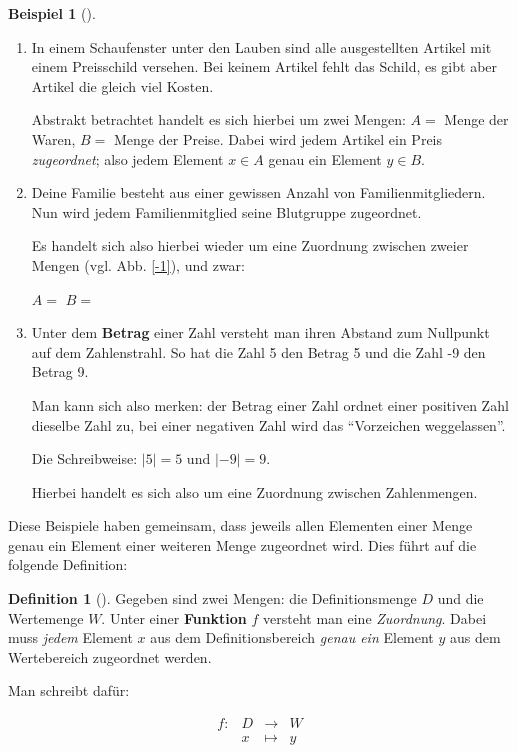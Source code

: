 \documentclass[a4paper, twoside, parskip, 10pt, smallheadings]{scrbook}
\theoremstyle{plain}
\theoremstyle{definition}
\newtheorem{Def}{Definition}%
\newtheorem{Bsp}{Beispiel}%
\newenvironment{fshaded}{%
\def\FrameCommand{\fcolorbox{framecolor}{shadecolor}}%
\MakeFramed {\FrameRestore}}%
{\endMakeFramed}
\newenvironment{fdef}[1][]{\definecolor{shadecolor}{rgb}{1,1,.29}%
\definecolor{framecolor}{rgb}{1,1,0}%
\begin{fshaded}\begin{Def}[#1]}{\end{Def}\end{fshaded}}
\newenvironment{fbsp}[1][]{\definecolor{shadecolor}{rgb}{.57,1,.28}%
\definecolor{framecolor}{rgb}{.25, .63, 0}%
\begin{fshaded}\begin{Bsp}[#1]}{\end{Bsp}\end{fshaded}}
\newcommand{\bb}{\begin{fbsp}}
\newcommand{\eb}{\end{fbsp}}
\newcommand{\bd}{\begin{fdef}}
\newcommand{\ed}{\end{fdef}}
\begin{document}
\bb
\begin{enumerate}
\item In einem Schaufenster unter den Lauben sind alle ausgestellten Artikel mit einem Preisschild versehen.
Bei keinem Artikel fehlt das Schild, es gibt aber Artikel die
gleich viel Kosten.

Abstrakt betrachtet handelt es sich hierbei um zwei Mengen: $A=$
Menge der Waren, $B=$ Menge der Preise. Dabei wird jedem Artikel
ein Preis {\it zugeordnet}; also jedem Element $x\in A$ genau ein
Element $y\in B$.

\item Deine Familie besteht aus einer gewissen Anzahl von
Familienmitgliedern. Nun wird jedem Familienmitglied seine
Blutgruppe zugeordnet.

Es handelt sich also hierbei wieder um eine Zuordnung zwischen
zweier Mengen (vgl. Abb. \ref{-1}), und zwar:

$A=$ \qquad \qquad   $B=$



\item Unter dem {\bf Betrag} einer Zahl versteht man ihren Abstand
zum Nullpunkt auf dem Zahlenstrahl. So hat die Zahl 5 den Betrag 5
und die Zahl -9 den Betrag 9. \label{7}

Man kann sich also merken: der Betrag einer Zahl ordnet einer positiven Zahl dieselbe Zahl zu, bei einer
negativen Zahl wird das "`Vorzeichen weggelassen"'.

Die Schreibweise: $|5|=5$ und $|-9|=9$.

Hierbei handelt es sich also um eine Zuordnung zwischen
Zahlenmengen.


\end{enumerate}
\eb

Diese Beispiele haben gemeinsam, dass jeweils allen Elementen einer Menge genau ein Element einer weiteren
Menge zugeordnet wird. Dies f\"{u}hrt auf die folgende Definition:

\bd
Gegeben sind zwei Mengen: die Definitionsmenge $D$ und die Wertemenge $W$. Unter einer {\bf Funktion} $f$
versteht man eine {\it Zuordnung}. Dabei muss {\it jedem} Element $x$ aus dem Definitionsbereich  {\it genau
ein} Element $y$ aus dem Wertebereich zugeordnet werden.

Man schreibt daf\"{u}r:

\[\begin{array}{rrcl}
  f: & D & \rightarrow & W \\
   & x & \mapsto & y
\end{array}\]
\ed
\end{document}
